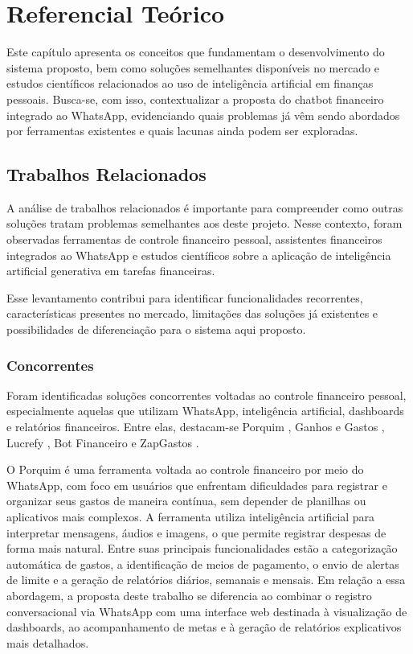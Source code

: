 \chapter{Referencial Teórico}

Este capítulo apresenta os conceitos que fundamentam o desenvolvimento do sistema proposto, bem como soluções semelhantes disponíveis no mercado e estudos científicos relacionados ao uso de inteligência artificial em finanças pessoais. Busca-se, com isso, contextualizar a proposta do chatbot financeiro integrado ao WhatsApp, evidenciando quais problemas já vêm sendo abordados por ferramentas existentes e quais lacunas ainda podem ser exploradas.

\section{Trabalhos Relacionados}

A análise de trabalhos relacionados é importante para compreender como outras soluções tratam problemas semelhantes aos deste projeto. Nesse contexto, foram observadas ferramentas de controle financeiro pessoal, assistentes financeiros integrados ao WhatsApp e estudos científicos sobre a aplicação de inteligência artificial generativa em tarefas financeiras.

Esse levantamento contribui para identificar funcionalidades recorrentes, características presentes no mercado, limitações das soluções já existentes e possibilidades de diferenciação para o sistema aqui proposto.

\subsection{Concorrentes}

Foram identificadas soluções concorrentes voltadas ao controle financeiro pessoal, especialmente aquelas que utilizam WhatsApp, inteligência artificial, dashboards e relatórios financeiros. Entre elas, destacam-se Porquim \cite{porquim_2026}, Ganhos e Gastos \cite{ganhos_gastos_2026}, Lucrefy \cite{lucrefy_2026}, Bot Financeiro \cite{bot_financeiro_2026} e ZapGastos \cite{zapgastos_2026}.

O Porquim \cite{porquim_2026} é uma ferramenta voltada ao controle financeiro por meio do WhatsApp, com foco em usuários que enfrentam dificuldades para registrar e organizar seus gastos de maneira contínua, sem depender de planilhas ou aplicativos mais complexos. A ferramenta utiliza inteligência artificial para interpretar mensagens, áudios e imagens, o que permite registrar despesas de forma mais natural. Entre suas principais funcionalidades estão a categorização automática de gastos, a identificação de meios de pagamento, o envio de alertas de limite e a geração de relatórios diários, semanais e mensais. Em relação a essa abordagem, a proposta deste trabalho se diferencia ao combinar o registro conversacional via WhatsApp com uma interface web destinada à visualização de dashboards, ao acompanhamento de metas e à geração de relatórios explicativos mais detalhados.

